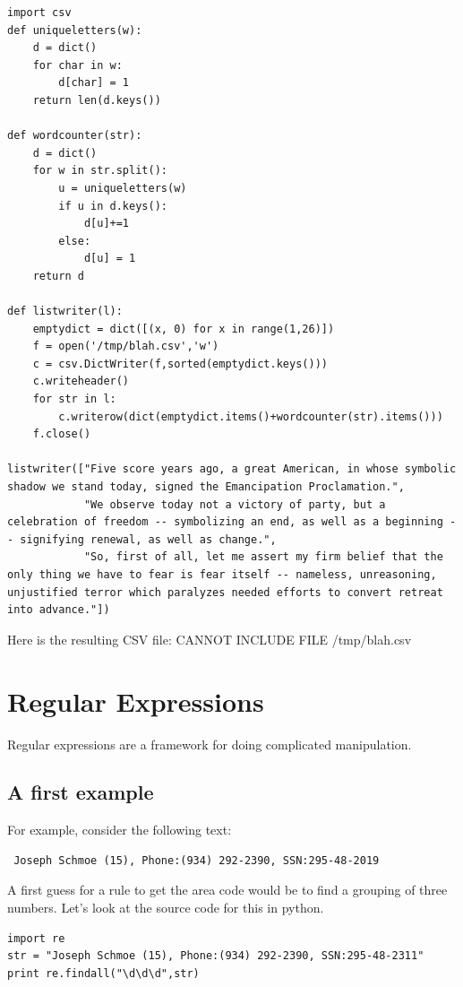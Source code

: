 \documentclass[11pt]{article}
\begin{document}
\begin{itemize}
\begin{verbatim}
import csv
def uniqueletters(w):
    d = dict()
    for char in w:
        d[char] = 1
    return len(d.keys())

def wordcounter(str):
    d = dict()
    for w in str.split():
        u = uniqueletters(w)
        if u in d.keys():           
            d[u]+=1
        else:
            d[u] = 1
    return d

def listwriter(l):
    emptydict = dict([(x, 0) for x in range(1,26)])
    f = open('/tmp/blah.csv','w')
    c = csv.DictWriter(f,sorted(emptydict.keys())) 
    c.writeheader()    
    for str in l:
        c.writerow(dict(emptydict.items()+wordcounter(str).items()))
    f.close()

listwriter(["Five score years ago, a great American, in whose symbolic shadow we stand today, signed the Emancipation Proclamation.",
            "We observe today not a victory of party, but a celebration of freedom -- symbolizing an end, as well as a beginning -- signifying renewal, as well as change.", 
            "So, first of all, let me assert my firm belief that the only thing we have to fear is fear itself -- nameless, unreasoning, unjustified terror which paralyzes needed efforts to convert retreat into advance."])
\end{verbatim}


Here is the resulting CSV file:
CANNOT INCLUDE FILE /tmp/blah.csv

\end{itemize} %
\section{Regular Expressions}
\label{sec-3}


Regular expressions are a framework for doing complicated
manipulation.  
\subsection{A first example}
\label{sec-3-1}


For example, consider the following text:
\begin{verbatim}
 Joseph Schmoe (15), Phone:(934) 292-2390, SSN:295-48-2019
\end{verbatim}
A first guess for a rule to get the area code would be to find a
grouping of three numbers.
Let's look at the source code for this in python.


\begin{verbatim}
import re  
str = "Joseph Schmoe (15), Phone:(934) 292-2390, SSN:295-48-2311"  
print re.findall("\d\d\d",str)
\end{verbatim}
\end{document}
